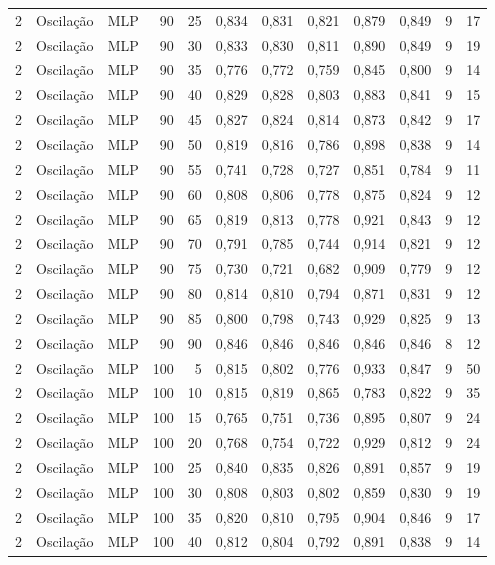 \begin{longtable}{@{}rllrrrrrrrrr@{}}
2 & Oscilação & MLP & 90 & 25 & 0,834 & 0,831 & 0,821 & 0,879 & 0,849 & 9 & 17 \\
2 & Oscilação & MLP & 90 & 30 & 0,833 & 0,830 & 0,811 & 0,890 & 0,849 & 9 & 19 \\
2 & Oscilação & MLP & 90 & 35 & 0,776 & 0,772 & 0,759 & 0,845 & 0,800 & 9 & 14 \\
2 & Oscilação & MLP & 90 & 40 & 0,829 & 0,828 & 0,803 & 0,883 & 0,841 & 9 & 15 \\
2 & Oscilação & MLP & 90 & 45 & 0,827 & 0,824 & 0,814 & 0,873 & 0,842 & 9 & 17 \\
2 & Oscilação & MLP & 90 & 50 & 0,819 & 0,816 & 0,786 & 0,898 & 0,838 & 9 & 14 \\
2 & Oscilação & MLP & 90 & 55 & 0,741 & 0,728 & 0,727 & 0,851 & 0,784 & 9 & 11 \\
2 & Oscilação & MLP & 90 & 60 & 0,808 & 0,806 & 0,778 & 0,875 & 0,824 & 9 & 12 \\
2 & Oscilação & MLP & 90 & 65 & 0,819 & 0,813 & 0,778 & 0,921 & 0,843 & 9 & 12 \\
2 & Oscilação & MLP & 90 & 70 & 0,791 & 0,785 & 0,744 & 0,914 & 0,821 & 9 & 12 \\
2 & Oscilação & MLP & 90 & 75 & 0,730 & 0,721 & 0,682 & 0,909 & 0,779 & 9 & 12 \\
2 & Oscilação & MLP & 90 & 80 & 0,814 & 0,810 & 0,794 & 0,871 & 0,831 & 9 & 12 \\
2 & Oscilação & MLP & 90 & 85 & 0,800 & 0,798 & 0,743 & 0,929 & 0,825 & 9 & 13 \\
2 & Oscilação & MLP & 90 & 90 & 0,846 & 0,846 & 0,846 & 0,846 & 0,846 & 8 & 12 \\
2 & Oscilação & MLP & 100 & 5 & 0,815 & 0,802 & 0,776 & 0,933 & 0,847 & 9 & 50 \\
2 & Oscilação & MLP & 100 & 10 & 0,815 & 0,819 & 0,865 & 0,783 & 0,822 & 9 & 35 \\
2 & Oscilação & MLP & 100 & 15 & 0,765 & 0,751 & 0,736 & 0,895 & 0,807 & 9 & 24 \\
2 & Oscilação & MLP & 100 & 20 & 0,768 & 0,754 & 0,722 & 0,929 & 0,812 & 9 & 24 \\
2 & Oscilação & MLP & 100 & 25 & 0,840 & 0,835 & 0,826 & 0,891 & 0,857 & 9 & 19 \\
2 & Oscilação & MLP & 100 & 30 & 0,808 & 0,803 & 0,802 & 0,859 & 0,830 & 9 & 19 \\
2 & Oscilação & MLP & 100 & 35 & 0,820 & 0,810 & 0,795 & 0,904 & 0,846 & 9 & 17 \\
2 & Oscilação & MLP & 100 & 40 & 0,812 & 0,804 & 0,792 & 0,891 & 0,838 & 9 & 14 \\

\end{longtable}
